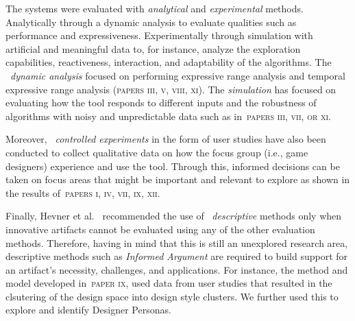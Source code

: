 The systems were evaluated with \emph{analytical} and \emph{experimental} methods. Analytically through a dynamic analysis to evaluate qualities such as performance and expressiveness. Experimentally through simulation with artificial and meaningful data to, for instance, analyze the exploration capabilities, reactiveness, interaction, and adaptability of the algorithms. The ~\emph{dynamic analysis} focused on performing expressive range analysis and temporal expressive range analysis (\textsc{papers iii, v, viii, xi}). The \emph{simulation} has focused on evaluating how the tool responds to different inputs and the robustness of algorithms with noisy and unpredictable data such as in~\textsc{papers iii, vii, or xi}.

Moreover, ~\emph{controlled experiments} in the form of user studies have also been conducted to collect qualitative data on how the focus group (i.e., game designers) experience and use the tool. Through this, informed decisions can be taken on focus areas that might be important and relevant to explore as shown in the results of~\textsc{papers i, iv, vii, ix, xii}. 


Finally, Hevner et al.~\cite{DSRM-Hevner} recommended the use of ~\emph{descriptive} methods only when innovative artifacts cannot be evaluated using any of the other evaluation methods. Therefore, having in mind that this is still an unexplored research area, descriptive methods such as \emph{Informed Argument} are required to build support for an artifact's necessity, challenges, and applications. For instance, the method and model developed in~\textsc{paper ix}, used data from user studies that resulted in the clsutering of the design space into design style clusters. We further used this to explore and identify Designer Personas.







